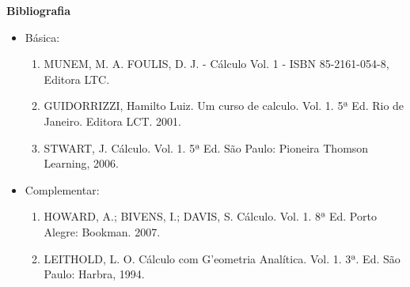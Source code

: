 
\begin{snugshade}\begin{center}\textbf{
    Bibliografia
}\end{center}\end{snugshade}

\begin{itemize} 
  \item Básica:
	\begin{enumerate}
	\item MUNEM, M. A. FOULIS, D. J. - Cálculo Vol. 1 - ISBN  85-2161-054-8, Editora LTC.
	\item GUIDORRIZZI, Hamilto Luiz. Um curso de calculo. Vol. 1. 5ª Ed. Rio de Janeiro. Editora LCT. 2001.
	\item STWART, J. Cálculo. Vol. 1. 5ª Ed. São Paulo: Pioneira Thomson Learning, 2006.
	\end{enumerate}
  \item Complementar:
	\begin{enumerate} 
	\item  HOWARD, A.; BIVENS, I.; DAVIS, S. Cálculo. Vol. 1. 8ª Ed. Porto Alegre: Bookman.  2007.
	\item  LEITHOLD, L. O. Cálculo com G'eometria Analítica. Vol. 1. 3ª. Ed. São Paulo: Harbra, 1994.
	\end{enumerate}
\end{itemize}
